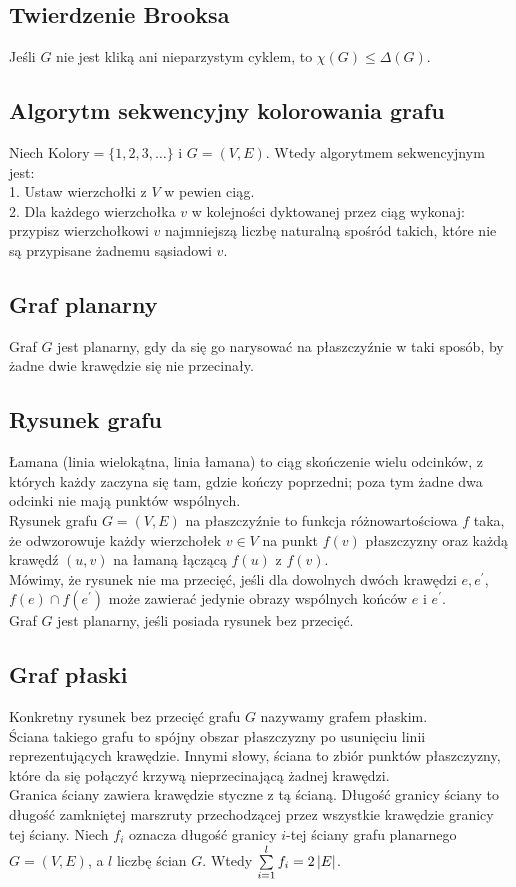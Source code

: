 \subsection*{Twierdzenie Brooksa}
Jeśli $G$ nie jest kliką ani nieparzystym cyklem, to $\chi (G) \leq \Delta (G)$.

\subsection*{Algorytm sekwencyjny kolorowania grafu}
Niech $\text{Kolory} = \{ 1, 2, 3, \dots \}$ i $G = (V, E)$. Wtedy algorytmem
sekwencyjnym jest: \\
1. Ustaw wierzchołki z $V$ w pewien ciąg. \\
2. Dla każdego wierzchołka $v$ w kolejności dyktowanej przez ciąg wykonaj:
przypisz wierzchołkowi $v$ najmniejszą liczbę naturalną spośród takich, które
nie są przypisane żadnemu sąsiadowi $v$.

\subsection*{Graf planarny}
Graf $G$ jest planarny, gdy da się go narysować na płaszczyźnie w taki sposób,
by żadne dwie krawędzie się nie przecinały.

\subsection*{Rysunek grafu}
Łamana (linia wielokątna, linia łamana) to ciąg skończenie wielu odcinków,
z których każdy zaczyna się tam, gdzie kończy poprzedni; poza tym żadne dwa
odcinki nie mają punktów wspólnych. \\
Rysunek grafu $G = (V, E)$ na płaszczyźnie to funkcja różnowartościowa $f$ taka,
że odwzorowuje każdy wierzchołek $v \in V$ na punkt $f(v)$ płaszczyzny oraz każdą
krawędź $(u, v)$ na łamaną łączącą $f(u)$ z $f(v)$. \\
Mówimy, że rysunek nie ma przecięć, jeśli dla dowolnych dwóch krawędzi $e, e^\prime$,
$f(e) \cap f(e^\prime)$ może zawierać jedynie obrazy wspólnych końców $e$ i $e^\prime$. \\
Graf $G$ jest planarny, jeśli posiada rysunek bez przecięć. 

\subsection*{Graf płaski}
Konkretny rysunek bez przecięć grafu $G$ nazywamy grafem płaskim. \\
Ściana takiego grafu to spójny obszar płaszczyzny po usunięciu linii reprezentujących 
krawędzie. Innymi słowy, ściana to zbiór punktów płaszczyzny, które da się połączyć
krzywą nieprzecinającą żadnej krawędzi. \\
Granica ściany zawiera krawędzie styczne z tą ścianą. Długość granicy ściany to
długość zamkniętej marszruty przechodzącej przez wszystkie krawędzie granicy tej 
ściany. Niech $f_i$ oznacza długość granicy $i$-tej ściany grafu planarnego $G = (V, E)$,
a $l$ liczbę ścian $G$. Wtedy $\sum\limits_{i=1}^{l} f_i = 2 \left| E \right|$.

